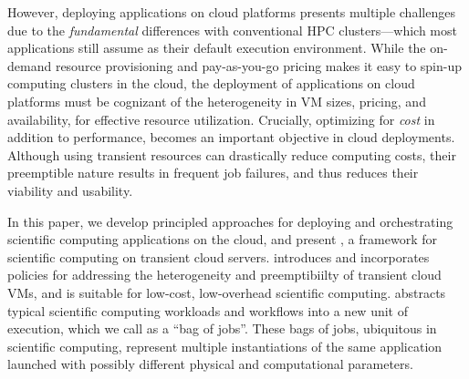 
However, deploying applications on cloud platforms presents multiple challenges due to the \emph{fundamental} differences with conventional HPC clusters---which most applications still assume as their default execution environment.
While the on-demand resource provisioning and pay-as-you-go pricing makes it easy to spin-up computing clusters in the cloud, the deployment of applications on cloud platforms must be cognizant of the heterogeneity in VM sizes, pricing, and availability, for effective resource utilization. 
Crucially, optimizing for \emph{cost} in addition to performance, becomes an important objective in cloud deployments.
%
Although using transient resources can drastically reduce computing costs, their preemptible nature results in frequent job failures, and thus reduces their viability and usability. 
%



In this paper, we develop principled approaches for deploying and orchestrating  scientific computing applications on the cloud, and present \sysname, a framework for scientific computing on transient cloud servers.
%
\sysname introduces and incorporates policies for addressing the heterogeneity and preemptibiilty of transient cloud VMs, and is suitable for low-cost, low-overhead scientific computing.
%
\sysname abstracts typical scientific computing workloads and workflows into a new unit of execution, which we call as a ``bag of jobs''. 
These bags of jobs, ubiquitous in scientific computing, represent multiple instantiations of the same application launched with possibly different physical and computational parameters. 



